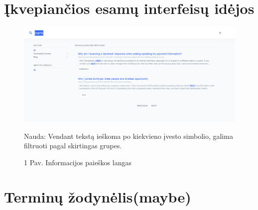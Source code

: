 \documentclass[oneside]{VUMIFPSkursinis}
\begin{document}
\section{Įkvepiančios esamų interfeisų idėjos}
\begin{figure}
  \includegraphics[width=\linewidth]{SearchWindow.png}
  \caption{1 Pav. Informacijos paieškos langas}
	\label{fig:searchWindow}
	Nauda: Vendant tekstą ieškoma po kiekvieno įvesto simbolio, galima filtruoti pagal skirtingas grupes.
\end{figure}

\section{Terminų žodynėlis(maybe)}
\end{document}
